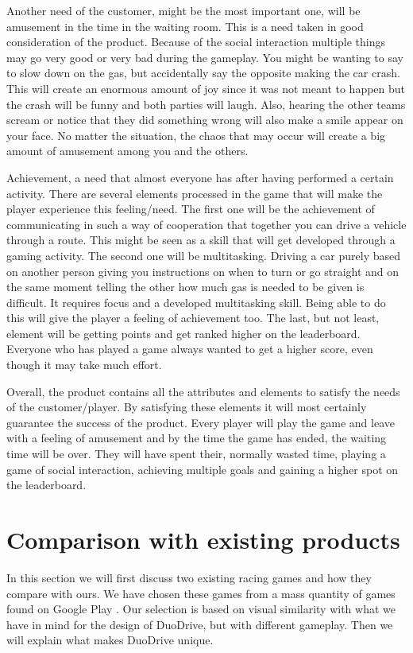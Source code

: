 \documentclass[11pt,twoside,a4paper]{article}
\begin{document}
Another need of the customer, might be the most important one, will be amusement in the time in the waiting room. This is a need taken in good consideration of the product. Because of the social interaction multiple things may go very good or very bad during the gameplay. You might be wanting to say to slow down on the gas, but accidentally say the opposite making the car crash. This will create an enormous amount of joy since it was not meant to happen but the crash will be funny and both parties will laugh. Also, hearing the other teams scream or notice that they did something wrong will also make a smile appear on your face. No matter the situation, the chaos that may occur will create a big amount of amusement among you and the others.

Achievement, a need that almost everyone has after having performed a certain activity. There are several elements processed in the game that will make the player experience this feeling/need. The first one will be the achievement of communicating in such a way of cooperation that together you can drive a vehicle through a route. This might be seen as a skill that will get developed through a gaming activity. The second one will be multitasking. Driving a car purely based on another person giving you instructions on when to turn or go straight and on the same moment telling the other how much gas is needed to be given is difficult. It requires focus and a developed multitasking skill. Being able to do this will give the player a feeling of achievement too. The last, but not least, element will be getting points and get ranked higher on the leaderboard. Everyone who has played a game always wanted to get a higher score, even though it may take much effort.

Overall, the product contains all the attributes and elements to satisfy the needs of the customer/player. By satisfying these elements it will most certainly guarantee the success of the product. Every player will play the game and leave with a feeling of amusement and by the time the game has ended, the waiting time will be over. They will have spent their, normally wasted time, playing a game of social interaction, achieving multiple goals and gaining a higher spot on the leaderboard.


\section{Comparison with existing products}
In this section we will first discuss two existing racing games and how they compare with ours. We have chosen these games from a mass quantity of games found on Google Play \cite{googleplay}. Our selection is based on visual similarity with what we have in mind for the design of DuoDrive, but with different gameplay. Then we will explain what makes DuoDrive unique.
\end{document}
